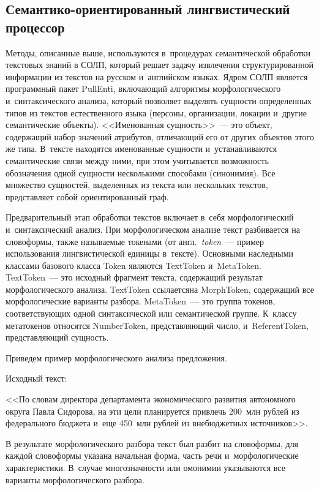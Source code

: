 \begin{multicols}{2}
\section{Семантико-ориентированный лингвистический процессор}
     
     Методы, описанные выше, используются в~процедурах семантической 
обработки текстовых знаний в СОЛП, который решает задачу извлечения 
структурированной информации из текс\-тов на русском и~английском языках. 
Ядром СОЛП является программный пакет PullEnti, вклю\-ча\-ющий алгоритмы 
морфологического и~синтаксического анализа, который позволяет выделять 
сущности определенных типов из текс\-тов естественного языка (персоны, 
организации, локации и~другие семантические объекты). <<Именованная 
сущность>>~--- это объект, содержащий набор значений атрибутов, 
отличающий его от других объектов этого же типа. В~тексте находятся 
именованные сущности и~устанавливаются семантические связи между 
ними, при этом учитывается воз\-мож\-ность обозначения одной сущ\-ности 
несколькими способами (синонимия). Все множество сущностей, 
выделенных из текста или нескольких текс\-тов, представляет собой 
ориентированный граф.
     
     Предварительный этап обработки текстов включает в~себя 
морфологический и~синтаксический анализ. При морфологическом анализе 
текст разбивается на словоформы, так\-же называемые токенами (от англ.\ 
\textit{token}~--- пример использования лингвистической единицы в~тексте). 
Основными наследными классами базового класса Token являются TextToken и~MetaToken. 
TextToken~--- это исходный фрагмент текста, содержащий результат 
морфологического анализа. TextToken ссылается\linebreak на MorphToken, 
содержащий все морфологические варианты разбора. MetaToken~--- это 
группа токенов, соответствующих одной синтаксической или семантической 
группе. К~классу метатокенов относятся NumberToken, пред\-став\-ля\-ющий 
чис\-ло, и~\mbox{ReferentToken}, представляющий сущ\-ность.
     
     Приведем пример морфологического анализа предложения.
     
     Исходный текст: 
     
     <<По словам директора департамента экономического развития 
автономного округа Павла Сидорова, на эти цели планируется при\-влечь 
200~млн рублей из федерального бюджета и~еще 450~млн 
рублей из внебюджетных источников>>.
     
     В результате морфологического разбора текст был разбит на 
словоформы, для каждой словоформы указана начальная форма, часть речи 
и~морфологические характеристики. В~случае мно\-го\-знач\-ности или 
омонимии указываются все варианты морфологического разбора. 
     

\end{multicols}

